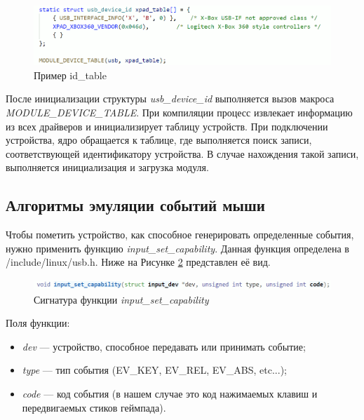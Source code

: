 \begin{figure}[h!]
	\centering
	\includegraphics[scale=0.8]{img/id-table.png}
	\caption{Пример id\_table}
	\label{id-table}
\end{figure}\par

После инициализации структуры \textit{usb\_device\_id} выполняется вызов
макроса \textit{MODULE\_DEVICE\_TABLE}. При компиляции процесс извлекает
информацию из всех драйверов и инициализирует таблицу устройств. При
подключении устройства, ядро обращается к таблице, где выполняется поиск
записи, соответствующей идентификатору устройства. В случае нахождения
такой записи, выполняется инициализация и загрузка модуля.

\subsection{Алгоритмы эмуляции событий мыши}
Чтобы пометить устройство, как способное генерировать определенные события, нужно 
применить функцию \textit{input\_set\_capability}. Данная функция определена в /include/linux/usb.h.
Ниже на Рисунке \ref{input_set} представлен её вид.
\begin{figure}[h!]
	\centering
	\includegraphics[scale=0.9]{img/input-set-capability.png}
	\caption{Сигнатура функции \textit{input\_set\_capability}}
	\label{input_set}
\end{figure}\par

Поля функции:
\begin{itemize}
	\item \textit{dev} --- устройство, способное передавать или принимать событие;
	\item \textit{type} --- тип события (EV\_KEY, EV\_REL, EV\_ABS, etc...);
	\item \textit{code} --- код события (в нашем случае это код нажимаемых клавиш и передвигаемых стиков геймпада).
\end{itemize}\par

